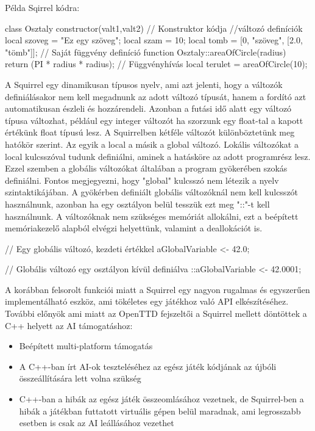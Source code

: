Példa Sqirrel kódra:

\begin{cpp}
class Osztaly
{	
  constructor(valt1,valt2)
  {
    // Konstruktor kódja
  }
  //változó definíciók	
  local szoveg = "Ez egy szöveg"; 
  local szam = 10;
  local tomb = [0, "szöveg", [2.0, "tömb"]];
}
// Saját függvény definíció
function Osztaly::areaOfCircle(radius) {
  return (PI * radius * radius);
}
// Függvényhívás
local terulet = areaOfCircle(10);	
\end{cpp}

A Squirrel egy dinamikusan típusos nyelv, ami azt jelenti, hogy a változók definiálásakor nem kell megadnunk az adott változó típusát, hanem a fordító azt automatikusan észleli és hozzárendeli. Azonban a futási idő alatt egy változó típusa változhat, például egy integer változót ha szorzunk egy float-tal a kapott értékünk float típusú lesz. A Squirrelben kétféle változót különböztetünk meg hatókör szerint. Az egyik a local a másik a global változó. Lokális változókat a local kulcsszóval tudunk definiálni, aminek a hatásköre az adott programrész lesz. Ezzel szemben a globális változókat általában a program gyökerében szokás definiálni. Fontos megjegyezni, hogy "global" kulcsszó nem létezik a nyelv szintaktikájában. A gyökérben definiált globális változóknál nem kell kulcsszót használnunk, azonban ha egy osztályon belül tesszük ezt meg "::"-t kell használnunk. A változóknak nem szükséges memóriát allokálni, ezt a beépített memóriakezelő alapból elvégzi helyettünk, valamint a deallokációt is.

\begin{cpp}
// Egy globális változó, kezdeti értékkel
aGlobalVariable <- 42.0;

// Globális változó egy osztályon kívül definiálva
::aGlobalVariable <- 42.0001;
\end{cpp}

A korábban felsorolt funkciói miatt a Squirrel egy nagyon rugalmas és egyszerűen implementálható eszköz, ami tökéletes egy játékhoz való API elkészítéséhez. További előnyök ami miatt az OpenTTD fejszeltői a Squirrel mellett döntöttek a C++ helyett az AI támogatáshoz:

\begin{itemize}
	\item Beépített multi-platform támogatás
	\item A C++-ban írt AI-ok teszteléséhez az egész játék kódjának az újbóli összeállítására lett volna szükség
	\item C++-ban a hibák az egész játék összeomlásához vezetnek, de Squirrel-ben a hibák a játékban futtatott virtuális gépen belül maradnak, ami legrosszabb esetben is csak az AI leállásához vezethet
\end{itemize}

